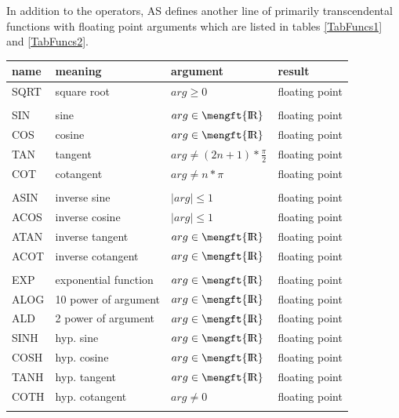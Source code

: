 \documentclass[12pt,twoside]{report}
\newcommand{\asname}{{AS}}
\def \rz{\hbox{\mengft{I \hskip -1.7mm R}}}
\begin{document}
In addition to the operators, \asname{} defines another line of
primarily transcendental functions with floating point arguments which are
listed in tables \ref{TabFuncs1} and \ref{TabFuncs2}.
\begin{center}\begin{longtable}{|l|l|l|l|}
\hline
name     & meaning              & argument             & result \\
\hline
\hline
SQRT     & square root          & $arg \geq 0$         & floating point \\
         &                      &                      & \\
SIN      & sine                 & $arg \in \rz$        & floating point \\
COS      & cosine               & $arg \in \rz$        & floating point \\
TAN      & tangent              & $arg \neq (2n+1)*\frac{\pi}{2}$ & floating point \\
COT      & cotangent            & $arg \neq n*\pi$     & floating point \\
         &                      &                      & \\
ASIN     & inverse sine         & $\mid arg \mid \leq 1$ & floating point \\
ACOS     & inverse cosine       & $\mid arg \mid \leq 1$ & floating point \\
ATAN     & inverse tangent      & $arg \in \rz$        & floating point \\
ACOT     & inverse cotangent    & $arg \in \rz$        & floating point \\
         &                      &                      & \\
EXP      & exponential function & $arg \in \rz$        & floating point \\
ALOG     & 10 power of argument & $arg \in \rz$        & floating point \\
ALD      & 2 power of argument  & $arg \in \rz$        & floating point \\
SINH     & hyp. sine            & $arg \in \rz$        & floating point \\
COSH     & hyp. cosine          & $arg \in \rz$        & floating point \\
TANH     & hyp. tangent         & $arg \in \rz$        & floating point \\
COTH     & hyp. cotangent       & $arg \neq 0$         & floating point \\
         &                      &                      & \\

\end{longtable}
\end{center}
\end{document}

